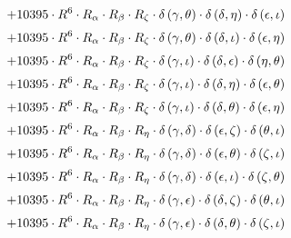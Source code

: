 \begin{subequations}
\begin{gather}
 \\[0.2em] \notag 		 + 10395 \cdot R^{6} \cdot R_{\alpha{}} \cdot R_{\beta{}} \cdot R_{\zeta{}} \cdot \delta{}\left(\gamma{}, \theta{}\right) \cdot \delta{}\left(\delta{}, \eta{}\right) \cdot \delta{}\left(\epsilon{}, \iota{}\right) 
 \\[0.2em] \notag 		 + 10395 \cdot R^{6} \cdot R_{\alpha{}} \cdot R_{\beta{}} \cdot R_{\zeta{}} \cdot \delta{}\left(\gamma{}, \theta{}\right) \cdot \delta{}\left(\delta{}, \iota{}\right) \cdot \delta{}\left(\epsilon{}, \eta{}\right) 
 \\[0.2em] \notag 		 + 10395 \cdot R^{6} \cdot R_{\alpha{}} \cdot R_{\beta{}} \cdot R_{\zeta{}} \cdot \delta{}\left(\gamma{}, \iota{}\right) \cdot \delta{}\left(\delta{}, \epsilon{}\right) \cdot \delta{}\left(\eta{}, \theta{}\right) 
 \\[0.2em] \notag 		 + 10395 \cdot R^{6} \cdot R_{\alpha{}} \cdot R_{\beta{}} \cdot R_{\zeta{}} \cdot \delta{}\left(\gamma{}, \iota{}\right) \cdot \delta{}\left(\delta{}, \eta{}\right) \cdot \delta{}\left(\epsilon{}, \theta{}\right) 
 \\[0.2em] \notag 		 + 10395 \cdot R^{6} \cdot R_{\alpha{}} \cdot R_{\beta{}} \cdot R_{\zeta{}} \cdot \delta{}\left(\gamma{}, \iota{}\right) \cdot \delta{}\left(\delta{}, \theta{}\right) \cdot \delta{}\left(\epsilon{}, \eta{}\right) 
 \\[0.2em] \notag 		 + 10395 \cdot R^{6} \cdot R_{\alpha{}} \cdot R_{\beta{}} \cdot R_{\eta{}} \cdot \delta{}\left(\gamma{}, \delta{}\right) \cdot \delta{}\left(\epsilon{}, \zeta{}\right) \cdot \delta{}\left(\theta{}, \iota{}\right) 
 \\[0.2em] \notag 		 + 10395 \cdot R^{6} \cdot R_{\alpha{}} \cdot R_{\beta{}} \cdot R_{\eta{}} \cdot \delta{}\left(\gamma{}, \delta{}\right) \cdot \delta{}\left(\epsilon{}, \theta{}\right) \cdot \delta{}\left(\zeta{}, \iota{}\right) 
 \\[0.2em] \notag 		 + 10395 \cdot R^{6} \cdot R_{\alpha{}} \cdot R_{\beta{}} \cdot R_{\eta{}} \cdot \delta{}\left(\gamma{}, \delta{}\right) \cdot \delta{}\left(\epsilon{}, \iota{}\right) \cdot \delta{}\left(\zeta{}, \theta{}\right) 
 \\[0.2em] \notag 		 + 10395 \cdot R^{6} \cdot R_{\alpha{}} \cdot R_{\beta{}} \cdot R_{\eta{}} \cdot \delta{}\left(\gamma{}, \epsilon{}\right) \cdot \delta{}\left(\delta{}, \zeta{}\right) \cdot \delta{}\left(\theta{}, \iota{}\right) 
 \\[0.2em] \notag 		 + 10395 \cdot R^{6} \cdot R_{\alpha{}} \cdot R_{\beta{}} \cdot R_{\eta{}} \cdot \delta{}\left(\gamma{}, \epsilon{}\right) \cdot \delta{}\left(\delta{}, \theta{}\right) \cdot \delta{}\left(\zeta{}, \iota{}\right) 

\end{gather}
\end{subequations}

